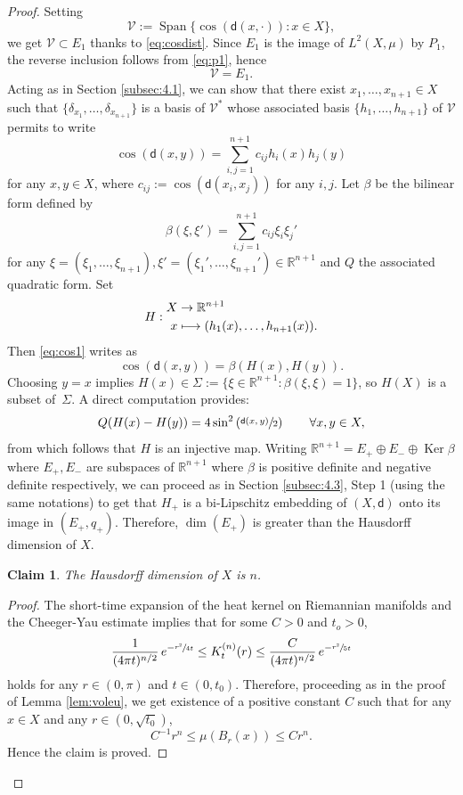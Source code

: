 \documentclass[10pt]{amsart}
\newcommand\mto{\mathchoice{\longmapsto}{\mapsto}{\mapsto}{\mapsto}}
\DeclareMathOperator{\Ker}{Ker}
\let\sep:
\theoremstyle{plain}
\newtheorem{claim}[theorem]{Claim}
\theoremstyle{definition}
\newcommand{\setR}{\mathbb{R}}
\newcommand{\cV}{\mathcal{V}}
\newcommand{\dist}{\mathsf{d}}
\DeclareMathOperator{\Span}{Span}
\begin{document}
\begin{proof}
Setting
\[
\cV:=\Span\{\cos(\dist(x,\cdot)): x \in X\},
\]
we get $\cV \subset E_1$ thanks to \eqref{eq:cosdist}. Since $E_1$ is the image of $L^2(X,\mu)$ by $P_1$, the reverse inclusion follows from \eqref{eq:p1}, hence
\[
\cV=E_1.
\]
Acting as in Section \ref{subsec:4.1}, we can show that there exist $x_1, \ldots, x_{n+1} \in X$ such that $\{\delta_{x_1},\ldots,\delta_{x_{n+1}}\}$ is a basis of $\cV^*$ whose associated basis $\{h_1,\ldots,h_{n+1}\}$ of $\cV$ permits to write
\begin{equation}\label{eq:cos1}
\cos(\dist(x,y)) = \sum_{i,j=1}^{n+1} c_{ij} h_i(x) h_j(y)
\end{equation}
for any $x,y \in X$, where $c_{ij}:=\cos(\dist(x_i,x_j))$ for any $i,j$. Let $\beta$ be the bilinear form defined by
\[
\beta(\xi,\xi') = \sum_{i,j=1}^{n+1} c_{ij}\xi_i \xi_j'
\]
for any $\xi=(\xi_1,\dots,\xi_{n+1}), \xi'=(\xi_1',\dots,\xi_{n+1}') \in \setR^{n+1}$ and $Q$ the associated quadratic form. Set
\[
H:
\begin{aligned}
X & \to \setR^{n+1}\\
x & \mto (h_1(x),\ldots,h_{n+1}(x)).
\end{aligned}
\]
Then \eqref{eq:cos1} writes as
\begin{equation}\label{eq:cos2}
\cos(\dist(x,y)) = \beta(H(x),H(y)).
\end{equation}
Choosing $y=x$ implies $H(x) \in \Sigma:=\{\xi \in \setR^{n+1} \sep \beta(\xi,\xi) =1\}$, so $H(X)$ is a subset of~$\Sigma$. A direct computation provides:
\begin{equation}\label{eq:cos3}
Q(H(x)-H(y))=4\sin^2\left(\sfrac{\dist(x,y)}{2}\right) \qquad \forall x,y \in X,
\end{equation}
from which follows that $H$ is an injective map. Writing $
\setR^{n+1} = E_+ \oplus E_- \oplus \Ker \beta$ where $E_+, E_-$ are subspaces of $\setR^{n+1}$ where $\beta$ is positive definite and negative definite respectively, we can proceed as in Section \ref{subsec:4.3}, Step 1 (using the same notations) to get that $H_+$ is a bi-Lipschitz embedding of $(X,\dist)$ onto its image in $(E_+,q_+)$. Therefore, $\dim(E_+)$ is greater than the Hausdorff dimension of $X$.

\begin{claim}
The Hausdorff dimension of $X$ is $n$.
\end{claim}

\begin{proof}
The short-time expansion of the heat kernel on Riemannian manifolds \cite{MinakshisundaramPleijel} and the Cheeger-Yau estimate \cite{CheegerYau} implies that for some $C>0$ and $t_o>0$,
\[
\frac{1}{(4\pi t)^{n/2}}\, e^{-\sfrac{r^2}{4t}} \le K_t^{(n)}(r) \le \frac{C}{(4\pi t)^{n/2}}\, e^{-\sfrac{r^2}{5t}}
\]
holds for any $r \in (0,\pi)$ and $t\in (0,t_0)$. Therefore, proceeding as in the proof of Lemma \ref{lem:voleu}, we get existence of a positive constant $C$ such that for any $x \in X$ and any $r\in (0,\sqrt{t_0})$,
\[
C^{-1}r^n\le \mu(B_r(x))\le C r^n.
\]
Hence the claim is proved.
\end{proof}


\end{proof}
\end{document}
